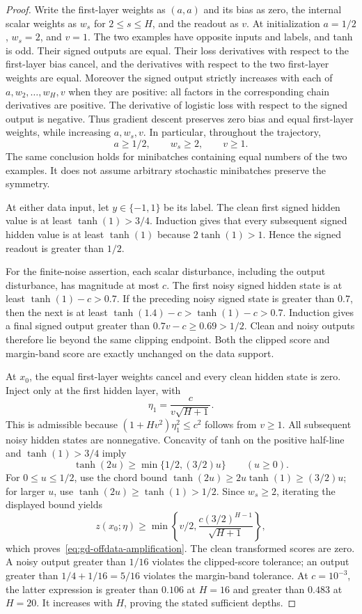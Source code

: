 \begin{proof}
Write the first-layer weights as $(a,a)$ and its bias as zero, the
internal scalar weights as $w_s$ for $2\le s\le H$, and the readout as
$v$. At initialization $a=1/2$, $w_s=2$, and $v=1$.
The two examples have opposite inputs and labels, and tanh is odd.
Their signed outputs are equal. Their loss derivatives with respect to
the first-layer bias cancel, and the derivatives with respect to the
two first-layer weights are equal. Moreover the signed output strictly
increases with each of $a,w_2,\ldots,w_H,v$ when they are positive:
all factors in the corresponding chain derivatives are positive.
The derivative of logistic loss with respect to the signed output is
negative. Thus gradient descent preserves zero bias and equal first-layer
weights, while increasing $a,w_s,v$. In particular, throughout the
trajectory,
\[
 a\ge1/2,\qquad w_s\ge2,\qquad v\ge1.
\]
The same conclusion holds for minibatches containing equal numbers of
the two examples. It does not assume arbitrary stochastic minibatches
preserve the symmetry.

At either data input, let $y\in\{-1,1\}$ be its label. The clean first
signed hidden value is at least $\tanh(1)>3/4$. Induction gives that every subsequent signed hidden value is at least
$\tanh(1)$ because $2\tanh(1)>1$. Hence the signed readout is greater than $1/2$.

For the finite-noise assertion, each scalar disturbance, including the
output disturbance, has magnitude at most $c$. The first noisy signed
hidden state is at least $\tanh(1)-c>0.7$. If the preceding noisy signed
state is greater than $0.7$, then the next is at least
$\tanh(1.4)-c>\tanh(1)-c>0.7$.
Induction gives a final signed output greater than
$0.7v-c\ge0.69>1/2$. Clean and noisy outputs therefore lie beyond the
same clipping endpoint. Both the clipped score and margin-band score
are exactly unchanged on the data support.

At $x_0$, the equal first-layer weights cancel and every clean hidden
state is zero. Inject only at the first hidden layer, with
\[
 \eta_1=\frac{c}{v\sqrt{H+1}}.
\]
This is admissible because
$(1+Hv^2)\eta_1^2\le c^2$ follows from $v\ge1$.
All subsequent noisy hidden states are nonnegative. Concavity of tanh
on the positive half-line and $\tanh(1)>3/4$ imply
\[
 \tanh(2u)\ge\min\{1/2,(3/2)u\}\qquad(u\ge0).
\]
For $0\le u\le1/2$, use the chord bound
$\tanh(2u)\ge2u\tanh(1)\ge(3/2)u$; for larger $u$, use
$\tanh(2u)\ge\tanh(1)>1/2$.
Since $w_s\ge2$, iterating the displayed bound yields
\[
 z(x_0;\eta)\ge
 \min\left\{v/2,\frac{c(3/2)^{H-1}}{\sqrt{H+1}}\right\},
\]
which proves~\eqref{eq:gd-offdata-amplification}.
The clean transformed scores are zero. A noisy output greater than
$1/16$ violates the clipped-score tolerance; an output greater than
$1/4+1/16=5/16$ violates the margin-band tolerance.
At $c=10^{-3}$, the latter expression is greater than $0.106$ at
$H=16$ and greater than $0.483$ at $H=20$. It increases with $H$,
proving the stated sufficient depths.
\end{proof}

